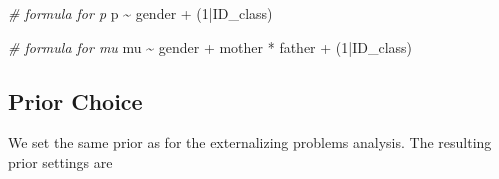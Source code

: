 \documentclass[
]{book}
\newenvironment{Shaded}{\begin{snugshade}}{\end{snugshade}}
\newcommand{\CommentTok}[1]{\textcolor[rgb]{0.56,0.35,0.01}{\textit{#1}}}
\newcommand{\DecValTok}[1]{\textcolor[rgb]{0.00,0.00,0.81}{#1}}
\newcommand{\NormalTok}[1]{#1}
\newcommand{\SpecialCharTok}[1]{\textcolor[rgb]{0.00,0.00,0.00}{#1}}
\begin{document}
\begin{Shaded}
\begin{Highlighting}[]
\CommentTok{\# formula for p}
\NormalTok{p }\SpecialCharTok{\textasciitilde{}}\NormalTok{ gender }\SpecialCharTok{+}\NormalTok{ (}\DecValTok{1}\SpecialCharTok{|}\NormalTok{ID\_class)}

\CommentTok{\# formula for mu}
\NormalTok{mu }\SpecialCharTok{\textasciitilde{}}\NormalTok{ gender }\SpecialCharTok{+}\NormalTok{ mother }\SpecialCharTok{*}\NormalTok{ father }\SpecialCharTok{+}\NormalTok{ (}\DecValTok{1}\SpecialCharTok{|}\NormalTok{ID\_class)}
\end{Highlighting}
\end{Shaded}

\hypertarget{prior-choice-1}{%
\subsection{Prior Choice}\label{prior-choice-1}}

We set the same prior as for the externalizing problems analysis. The resulting prior settings are
\end{document}
